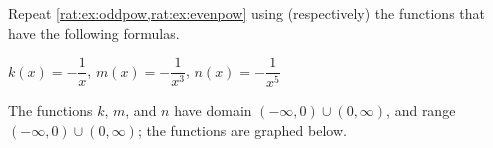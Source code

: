 \begin{doyouunderstand}
	\begin{problem}
	Repeat \cref{rat:ex:oddpow,rat:ex:evenpow} using (respectively) the 
	functions that have the following formulas.
	\begin{subproblem}
		$k(x)=-\dfrac{1}{x}$, $ m(x)=-\dfrac{1}{x^3}$, $ n(x)=-\dfrac{1}{x^5}$
		\begin{shortsolution}
			The functions $k$, $m$, and $n$ have domain $(-\infty,0)\cup (0,\infty)$, and 
			range $(-\infty,0)\cup (0,\infty)$; the functions are graphed below.
						
						

\end{shortsolution}
\end{subproblem}
\end{problem}
\end{doyouunderstand}
